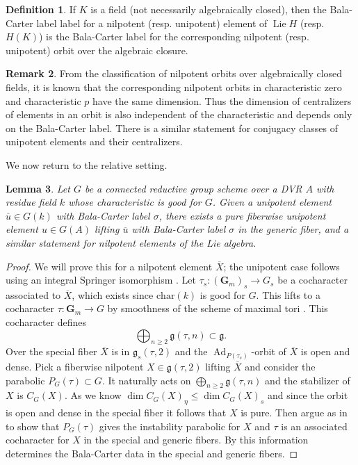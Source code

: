\documentclass[11pt, letterpaper,english]{amsart}
\theoremstyle{plain}
\newtheorem{lem}{Lemma}
\theoremstyle{definition}
\newtheorem{defn}[lem]{Definition}
\newtheorem{remark}[lem]{Remark}
\numberwithin{equation}{section}
\numberwithin{lem}{section}
\newcommand{\mathfont}{\mathbf}
\DeclareMathOperator{\Lie}{Lie}
\newcommand{\Gm}{\mathfont{G}_m}
\DeclareMathOperator{\Ad}{Ad}
\newcommand{\g}{\mathfrak{g}}
\begin{document}
\begin{defn}
If $K$ is a field (not necessarily algebraically closed), then the Bala-Carter label label for a nilpotent (resp. unipotent) element of $\Lie H$ (resp. $H(K)$)  is the Bala-Carter label for the corresponding nilpotent (resp. unipotent) orbit over the algebraic closure.
\end{defn}


\begin{remark}
 From the classification of nilpotent orbits over algebraically closed fields, it is known that the corresponding nilpotent orbits in characteristic zero and characteristic $p$ have the same dimension.  Thus the dimension of centralizers of elements in an orbit is also  independent of the characteristic and depends only on the Bala-Carter label.   There is a similar statement for conjugacy classes of unipotent elements and their centralizers.
\end{remark}


We now return to the relative setting.

\begin{lem} \label{lemma:purelift}
Let $G$ be a connected reductive group scheme over a DVR $A$ with residue field $k$ whose characteristic is good for $G$.  Given a unipotent element $\overline{u} \in G(k)$ with Bala-Carter label $\sigma$, there exists a pure fiberwise unipotent element $u \in G(A)$ lifting $\overline{u}$ with Bala-Carter label $\sigma$ in the generic fiber, and a similar statement for nilpotent elements of the Lie algebra.  
\end{lem}


\begin{proof}
We will prove this for a nilpotent element $\overline{X}$; the unipotent case follows using an integral Springer isomorphism \cite[Theorem 1.1]{Integral-Springer}.  Let $\tau_s : (\Gm)_s \to G_s$ be a cocharacter associated to $\overline{X}$, which exists since $\textrm{char}(k)$ is good for $G$.  This lifts to a cocharacter $\tau : \Gm \to G$ by smoothness of the scheme of maximal tori \cite[Theorem 3.2.6]{conrad}.  
This cocharacter defines 
\[
\bigoplus_{n \geq 2} \g(\tau,n) \subset \g.
\]
Over the special fiber $\overline{X}$ is in $\g_s(\tau,2)$ and the $\Ad_{P(\tau_s)}$-orbit of $\overline{X}$ is open and dense.  Pick a fiberwise nilpotent $X \in \g(\tau,2)$ lifting $\overline{X}$ and consider the parabolic $P_G(\tau) \subset G$.  It naturally acts on $\bigoplus_{n \geq 2} \g(\tau,n) $ and the stabilizer of $X$ is $C_G(X)$.  As we know $\dim C_G(X)_\eta \leq \dim C_G(X)_s$ and since the orbit is open and dense in the special fiber it follows that $X$ is pure.  Then argue as in \cite[Lemma 5.2]{cotner} to show that $P_G(\tau)$ gives the instability parabolic for $X$ and $\tau$ is an associated cocharacter for $X$ in the special and generic fibers.  By \cite[Proposition 2.13(6)]{cotner} this information determines the Bala-Carter data in the special and generic fibers.  
\end{proof}
\end{document}
